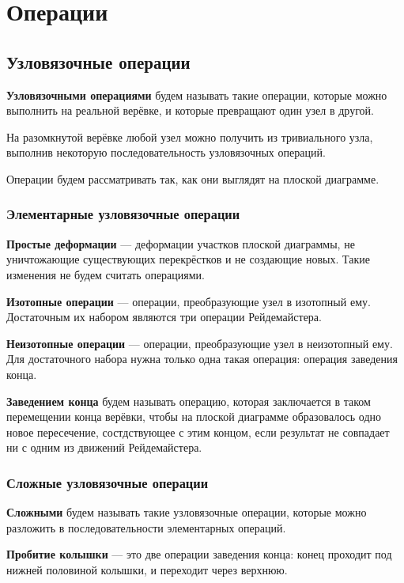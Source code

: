 \section{Операции}

\subsection{Узловязочные операции}

\textbf{Узловязочными операциями} будем называть такие операции, которые можно выполнить на реальной верёвке, и которые превращают один узел в другой.

На разомкнутой верёвке любой узел можно получить из тривиального узла, выполнив некоторую последовательность узловязочных операций.

Операции будем рассматривать так, как они выглядят на плоской диаграмме.

\subsubsection{Элементарные узловязочные операции}

\textbf{Простые деформации}  --- деформации участков плоской диаграммы, не уничтожающие существующих перекрёстков и не создающие новых. Такие изменения не будем считать операциями.

\textbf{Изотопные операции}  --- операции, преобразующие узел в изотопный ему. Достаточным их набором являются три операции Рейдемайстера.

\textbf{Неизотопные операции}  --- операции, преобразующие узел в неизотопный ему. Для достаточного набора нужна только одна такая операция: операция заведения конца.

\textbf{Заведением конца}  будем называть операцию, которая заключается в таком перемещении конца верёвки, чтобы на плоской диаграмме образовалось одно новое пересечение, состдствующее с этим концом, если результат не совпадает ни с одним из движений Рейдемайстера.

\subsubsection{Сложные узловязочные операции}

\textbf{Сложными} будем называть такие узловязочные операции, которые можно разложить в последовательности элементарных операций.

\textbf{Пробитие колышки} --- это две операции заведения конца: конец проходит под нижней половиной колышки, и переходит через верхнюю.


